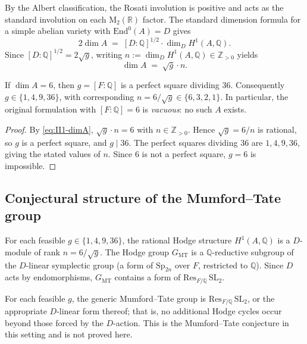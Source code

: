 \documentclass{article}
\begin{document}
By the Albert classification, the Rosati involution is positive and acts as
the standard involution on each $\mathrm{M}_2(\mathbb{R})$ factor. The
standard dimension formula for a simple abelian variety with
$\mathrm{End}^0(A) = D$ gives
\begin{equation}
\label{eq:II1-dimformula}
2\dim A \;=\; [D:\mathbb{Q}]^{1/2}\cdot \dim_D H^1(A,\mathbb{Q}).
\end{equation}
Since $[D:\mathbb{Q}]^{1/2} = 2\sqrt{g}$, writing
$n := \dim_D H^1(A,\mathbb{Q}) \in \mathbb{Z}_{>0}$ yields
\begin{equation}
\label{eq:II1-dimA}
\dim A \;=\; \sqrt{g}\cdot n .
\end{equation}

\begin{proposition}
\label{prop:II1-vacuous}
If $\dim A = 6$, then $g = [F:\mathbb{Q}]$ is a perfect square dividing
$36$. Consequently $g \in \{1,4,9,36\}$, with corresponding
$n = 6/\sqrt{g} \in \{6,3,2,1\}$. In particular, the original formulation
with $[F:\mathbb{Q}] = 6$ is \emph{vacuous}: no such $A$ exists.
\end{proposition}

\begin{proof}
By \eqref{eq:II1-dimA}, $\sqrt{g}\cdot n = 6$ with $n \in \mathbb{Z}_{>0}$.
Hence $\sqrt{g} = 6/n$ is rational, so $g$ is a perfect square, and
$g \mid 36$. The perfect squares dividing $36$ are $1,4,9,36$, giving the
stated values of $n$. Since $6$ is not a perfect square, $g=6$ is
impossible.
\end{proof}

\subsection{Conjectural structure of the Mumford--Tate group}
\label{sec:II1-MT}

For each feasible $g \in \{1,4,9,36\}$, the rational Hodge structure
$H^1(A,\mathbb{Q})$ is a $D$-module of rank $n = 6/\sqrt{g}$. The Hodge
group $G_{\mathrm{MT}}$ is a $\mathbb{Q}$-reductive subgroup of the
$D$-linear symplectic group (a form of $\mathrm{Sp}_{2n}$ over $F$,
restricted to $\mathbb{Q}$). Since $D$ acts by endomorphisms,
$G_{\mathrm{MT}}$ contains a form of $\mathrm{Res}_{F/\mathbb{Q}}\,
\mathrm{SL}_2$.

\begin{conjecture}
\label{conj:II1-MT}
For each feasible $g$, the generic Mumford--Tate group is
$\mathrm{Res}_{F/\mathbb{Q}}\,\mathrm{SL}_2$, or the appropriate
$D$-linear form thereof; that is, no additional Hodge cycles occur beyond
those forced by the $D$-action. This is the Mumford--Tate conjecture in
this setting and is not proved here.
\end{conjecture}
\end{document}

